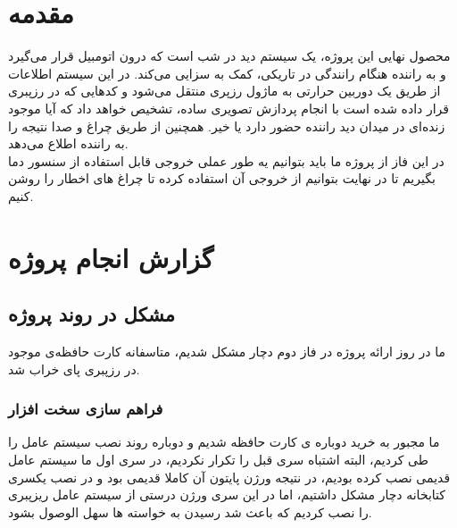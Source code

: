 \documentclass[12pt]{article}
\begin{document}
\newpage
\pagestyle{fancy}
\fancyhf{}
\fancyfoot{}
\cfoot{\thepage}
\chead{}

\newfontfamily{}

\KashidaOff
 \newcommand{\inlineLatin}[1]{
	\small{\lr{{\terminal #1}}}
}


\tableofcontents
\listoffigures
\listoftables

\newpage
\section{مقدمه}

محصول نهایی این پروژه، یک سیستم دید در شب است که درون اتومبیل قرار می‌گیرد و به راننده هنگام رانندگی در تاریکی، کمک به سزایی می‌کند. در این سیستم اطلاعات از طریق یک دوربین حرارتی به ماژول رزپری منتقل می‌شود و کدهایی که در رزپبری قرار داده شده است با انجام پردازش تصویری ساده، تشخیص خواهد داد که آیا موجود زنده‌ای در میدان دید راننده حضور دارد یا خیر. همچنین از طریق چراغ و صدا نتیجه را به راننده اطلاع می‌دهد.
\\

در این فاز از پروژه ما باید بتوانیم یه طور عملی خروجی قابل استفاده از سنسور دما بگیریم تا در نهایت بتوانیم از خروجی آن استفاده کرده تا چراغ های اخطار را روشن کنیم.

\section{گزارش انجام پروژه}
\subsection{مشکل در روند پروژه}

ما در روز ارائه پروژه در فاز دوم دچار مشکل شدیم، متاسفانه کارت حافظه‌ی موجود در رزپبری پای خراب شد.

\subsubsection{فراهم سازی سخت افزار}

ما مجبور به خرید دوباره ی کارت حافظه شدیم و دوباره روند نصب سیستم عامل را طی کردیم، البته اشتباه سری قبل را تکرار نکردیم، در سری اول ما سیستم عامل قدیمی نصب کرده بودیم، در نتیجه ورژن پایتون آن کاملا قدیمی بود و در نصب یکسری کتابخانه دچار مشکل داشتیم، اما در این سری ورژن درستی از سیستم عامل ریزپبری را نصب کردیم که باعث شد رسیدن به خواسته ها سهل الوصول بشود.
\end{document}
